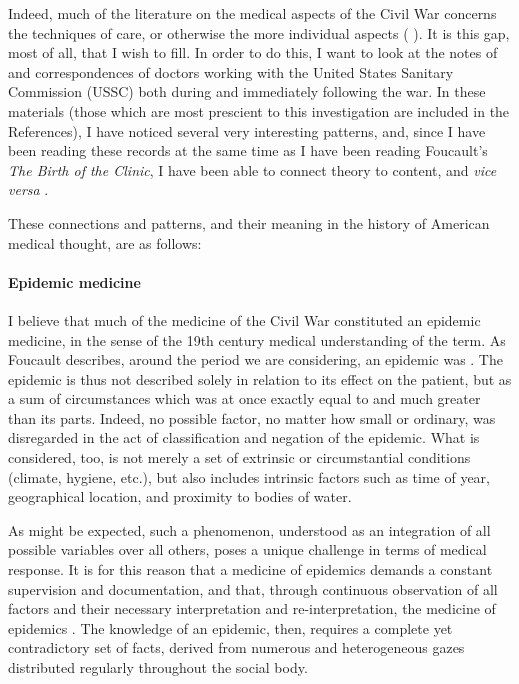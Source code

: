 \documentclass{report}
\begin{document}
  Indeed, much of the literature on the medical aspects of the Civil War concerns the techniques of care, or otherwise the more individual aspects 
  (\citeauthor{Devine2016} ). It is this gap, most of all, that I wish to fill. In order to do this, I want to look at the notes of and
  correspondences of doctors working with the United States Sanitary Commission (USSC) both during and immediately following the war. In these materials 
  (those which are most prescient to this investigation are included in the References), I have noticed several very interesting patterns, and, since I have
  been reading these records at the same time as I have been reading Foucault's \textit{The Birth of the Clinic}, I have been able to connect theory to
  content, and \textit{vice versa} \autocite{Foucault1994}.

  These connections and patterns, and their meaning in the history of American medical thought, are as follows:
  \paragraph{Epidemic medicine}\label{par:epidemic_medicine} %
  I believe that much of the medicine of the Civil War constituted an epidemic medicine, in the sense of the 19th century medical understanding of the term.
  As Foucault describes, around the period we are considering, an epidemic was  \autocite[pp. 23]{Foucault1994}. The epidemic is thus not described solely in relation to its
  effect on the patient, but as a sum of circumstances which was at once exactly equal to and much greater than its parts. Indeed, no possible factor,
  no matter how small or ordinary, was disregarded in the act of classification and negation of the epidemic. What is considered, too, is not merely a set
  of extrinsic or circumstantial conditions (climate, hygiene, etc.), but also includes intrinsic factors such as time of year, geographical location,
  and proximity to bodies of water. 

  As might be expected, such a phenomenon, understood as an integration of all possible variables over all others, poses a unique challenge in terms of medical
  response. It is for this reason that a medicine of epidemics demands a constant supervision and documentation, and that, through continuous observation
  of all factors and their necessary interpretation and re-interpretation, the medicine of epidemics  \autocite[pp. 25]{Foucault1994}. The knowledge of an epidemic, then, requires a complete
  yet contradictory set of facts, derived from numerous and heterogeneous gazes distributed regularly throughout the social body. 
\end{document}

